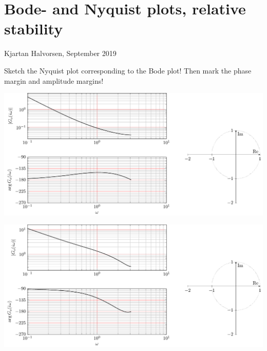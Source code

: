 \documentclass[letterpaper]{scrartcl}
\author{Kjartan Halvorsen}
\date{}
\title{}
\begin{document}
\section*{Bode- and Nyquist plots, relative stability}
\label{sec:org208b430}
Kjartan Halvorsen, September 2019

Sketch the Nyquist plot corresponding to the Bode plot! Then mark the phase margin and amplitude margins!
\begin{center}
\includegraphics[width=1.15\linewidth]{../../figures/bode-nyquist-exc-1}
\end{center}

\begin{center}
\includegraphics[width=1.15\linewidth]{../../figures/bode-nyquist-exc-2}
\end{center}
\end{document}
